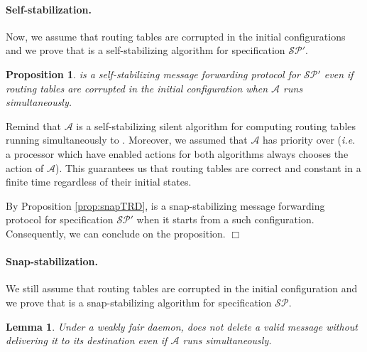 \documentclass[11pt]{article}
\newtheorem{lemma}{Lemma}
\newtheorem{proposition}{Proposition}
\newenvironment{proof}{{\noindent\bf Proof. } }{{\hfill $\Box$}}
\begin{document}
\paragraph{Self-stabilization.} Now, we assume that routing tables are corrupted in the initial configurations and we prove that \AD is a self-stabilizing algorithm for specification $\mathcal{SP}'$.

\begin{proposition} \label{prop:selfD}
\AD is a self-stabilizing message forwarding protocol for $\mathcal{SP}'$ even if routing tables are corrupted in the initial configuration when $\mathcal{A}$ runs simultaneously.
\end{proposition}

\begin{proof}
Remind that $\mathcal{A}$ is a self-stabilizing silent algorithm for computing routing tables running simultaneously to \AD. Moreover, we assumed that $\mathcal{A}$ has priority over \AD (\emph{i.e.} a processor which have enabled actions for both algorithms always chooses the action of $\mathcal{A}$). This guarantees us that routing tables are correct and constant in a finite time regardless of their initial states. 

By Proposition \ref{prop:snapTRD}, \AD is a snap-stabilizing message forwarding protocol for specification $\mathcal{SP}'$ when it starts from a such configuration. Consequently, we can conclude on the proposition.
\end{proof}

\paragraph{Snap-stabilization.} We still assume that routing tables are corrupted in the initial configuration and we prove that \AD is a snap-stabilizing algorithm for specification $\mathcal{SP}$.

\begin{lemma} \label{lem:perteD}
Under a weakly fair daemon, \AD does not delete a valid message without delivering it to its destination even if $\mathcal{A}$ runs simultaneously.
\end{lemma}
\end{document}
